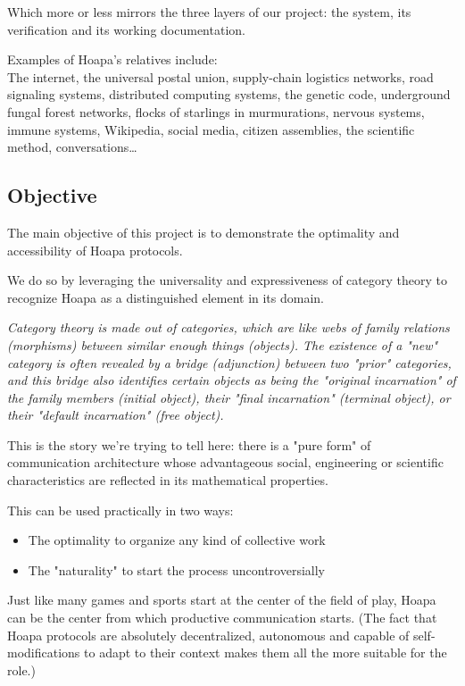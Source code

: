 \documentclass[11pt]{article}
\begin{document}
Which more or less mirrors the three layers of our project: the system, its verification and its working documentation.

Examples of Hoapa's relatives include: \\ The internet, the universal postal union, supply-chain logistics networks, road signaling systems, distributed computing systems, the genetic code, underground fungal forest networks, flocks of starlings in murmurations, nervous systems, immune systems, Wikipedia, social media, citizen assemblies, the scientific method, conversations\ldots{}

\subsection{Objective}

The main objective of this project is to demonstrate the optimality and accessibility of Hoapa protocols.

We do so by leveraging the universality and expressiveness of category theory to recognize Hoapa as a distinguished element in its domain.

\emph{Category theory is made out of categories, which are like webs of family relations (morphisms) between similar enough things (objects). The existence of a "new" category is often revealed by a bridge (adjunction) between two "prior" categories, and this bridge also identifies certain objects as being the "original incarnation" of the family members (initial object), their "final incarnation" (terminal object), or their "default incarnation" (free object).}

This is the story we're trying to tell here: there is a "pure form" of communication architecture whose advantageous social, engineering or scientific characteristics are reflected in its mathematical properties.

This can be used practically in two ways:

\begin{itemize}

\item The optimality to organize any kind of collective work

\item The "naturality" to start the process uncontroversially

\end{itemize}

Just like many games and sports start at the center of the field of play, Hoapa can be the center from which productive communication starts. (The fact that Hoapa protocols are absolutely decentralized, autonomous and capable of self-modifications to adapt to their context makes them all the more suitable for the role.)
\end{document}
